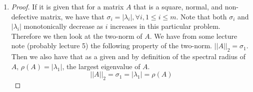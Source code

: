 \documentclass{article}
\begin{document}
\begin{enumerate}
\begin{enumerate}
\begin{proof}
\end{proof}

\item
\begin{proof}
    If it is given that for a matrix $A$ that is a square, normal, and non-defective matrix, we have that $\sigma_i = |\lambda_i|, \forall i, 1 \le i \le m$. Note that both $\sigma_i$ and $|\lambda_i|$ monotonically decrease as $i$ increases in this particular problem.  Therefore we then look at the two-norm of $A$. We have from some lecture note (probably lecture 5) the following property of the two-norm. $||A||_2 = \sigma_1$. Then we also have that as a given and by definition of the spectral radius of $A$, $\rho(A) = |\lambda_1|$, the largest eigenvalue of $A$.
    \[
        ||A||_2 =  \sigma_1 = |\lambda_1| = \rho(A)
    \]
\end{proof}

\end{enumerate}



\end{enumerate}
\end{document}
